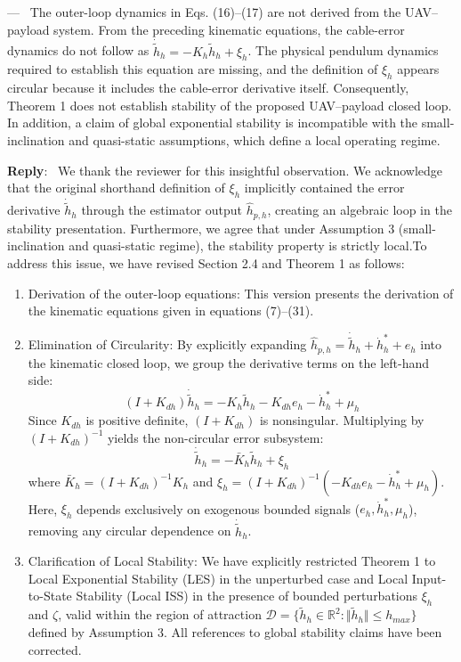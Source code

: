 \documentclass[11pt]{article}
\newcounter{reviewer}
\newcounter{point}[reviewer]
\renewcommand{\thepoint}{Comment\,\thereviewer.\arabic{point}}
\newenvironment{point}
   {\refstepcounter{point} \bigskip \noindent {\textbf{Reviewer~\thepoint} } ---\ }
   {\par }
\newenvironment{reply}
   {\medskip \noindent \color{blue} \begin{sf}\textbf{Reply}:\  }
   {\medskip \par \end{sf}}
\begin{document}
\begin{point}
The outer-loop dynamics in Eqs. (16)–(17) are not derived from the UAV–payload system. From the preceding kinematic equations, the cable-error dynamics do not follow as \(\dot{\tilde h}_h=-K_h\tilde h_h+\xi_h\). The physical pendulum dynamics required to establish this equation are missing, and the definition of \(\xi_h\) appears circular because it includes the cable-error derivative itself. Consequently, Theorem 1 does not establish stability of the proposed UAV–payload closed loop. In addition, a claim of global exponential stability is incompatible with the small-inclination and quasi-static assumptions, which define a local operating regime.
\end{point}

\begin{reply}
We thank the reviewer for this insightful observation. We acknowledge that the original shorthand definition of $\xi_h$ implicitly contained the error derivative $\dot{\tilde{h}}_h$ through the estimator output $\hat{h}_{p,h}$, creating an algebraic loop in the stability presentation. Furthermore, we agree that under Assumption 3 (small-inclination and quasi-static regime), the stability property is strictly local.To address this issue, we have revised Section 2.4 and Theorem 1 as follows:
\begin{enumerate}
\item Derivation of the outer-loop equations: This version presents the derivation of the kinematic equations given in equations (7)–(31).
\item Elimination of Circularity: By explicitly expanding $\hat{h}_{p,h} = \dot{\tilde{h}}_h + \dot{h}_h^* + e_h$ into the kinematic closed loop, we group the derivative terms on the left-hand side:$$(I + K_{dh}) \dot{\tilde{h}}_h = -K_h \tilde{h}_h - K_{dh} e_h - \dot{h}_h^* + \mu_h$$Since $K_{dh}$ is positive definite, $(I + K_{dh})$ is nonsingular. Multiplying by $(I + K_{dh})^{-1}$ yields the non-circular error subsystem:$$\dot{\tilde{h}}_h = -\bar{K}_h \tilde{h}_h + \xi_h$$where $\bar{K}_h = (I + K_{dh})^{-1} K_h$ and $\xi_h = (I + K_{dh})^{-1} (-K_{dh} e_h - \dot{h}_h^* + \mu_h)$. Here, $\xi_h$ depends exclusively on exogenous bounded signals ($e_h, \dot{h}_h^*, \mu_h$), removing any circular dependence on $\dot{\tilde{h}}_h$.
\item Clarification of Local Stability: We have explicitly restricted Theorem 1 to Local Exponential Stability (LES) in the unperturbed case and Local Input-to-State Stability (Local ISS) in the presence of bounded perturbations $\xi_h$ and $\zeta$, valid within the region of attraction $\mathcal{D} = \{\tilde{h}_h \in \mathbb{R}^2 : \Vert{}\tilde{h}_h\Vert{} \le h_{max}\}$ defined by Assumption 3. All references to global stability claims have been corrected.
\end{enumerate}
\end{reply}
\end{document}
